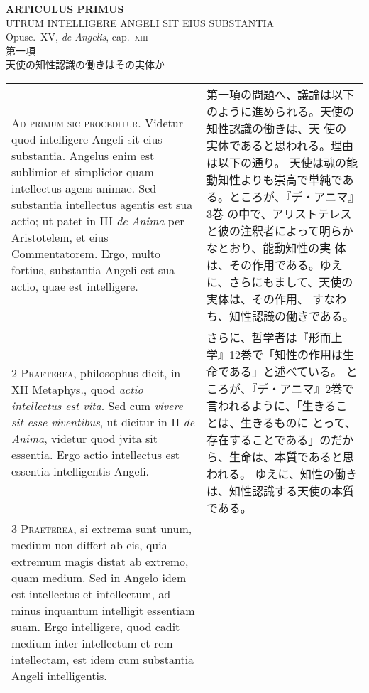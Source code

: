 \documentclass[10pt]{jsarticle} %
\begin{document}
\begin{center}
 {\Large {\bf ARTICULUS PRIMUS}}\\
 {\large UTRUM INTELLIGERE ANGELI SIT EIUS SUBSTANTIA}\\
 {\footnotesize Opusc.~XV, {\itshape de Angelis}, cap.~{\scshape xiii}}\\
 {\Large 第一項\\天使の知性認識の働きはその実体か}
\end{center}

\begin{longtable}{p{21em}p{21em}}

{\huge A}{\scshape d primum sic proceditur}. Videtur quod intelligere
Angeli sit eius substantia. Angelus enim est sublimior et simplicior
quam intellectus agens animae. Sed substantia intellectus agentis est
sua actio; ut patet in III {\itshape de Anima} per Aristotelem, et eius
Commentatorem. Ergo, multo fortius, substantia Angeli est sua actio,
quae est intelligere.


&

第一項の問題へ、議論は以下のように進められる。天使の知性認識の働きは、天
使の実体であると思われる。理由は以下の通り。
天使は魂の能動知性よりも崇高で単純である。ところが、『デ・アニマ』3巻
 の中で、アリストテレスと彼の注釈者によって明らかなとおり、能動知性の実
 体は、その作用である。ゆえに、さらにもまして、天使の実体は、その作用、
 すなわち、知性認識の働きである。
 

\\

{\scshape  2 Praeterea}, philosophus dicit, in XII Metaphys., quod {\itshape actio
 intellectus est vita}. Sed cum {\itshape vivere sit esse viventibus}, ut dicitur in
 II {\itshape de Anima}, videtur quod jvita sit essentia. Ergo actio intellectus est
 essentia intelligentis Angeli.

&

さらに、哲学者は『形而上学』12巻で「知性の作用は生命である」と述べている。
 ところが、『デ・アニマ』2巻で言われるように、「生きることは、生きるものに
 とって、存在することである」のだから、生命は、本質であると思われる。
ゆえに、知性の働きは、知性認識する天使の本質である。



\\


{\scshape  3 Praeterea}, si extrema sunt unum, medium non differt ab
 eis, quia extremum magis distat ab extremo, quam medium. Sed in Angelo
 idem est intellectus et intellectum, ad minus inquantum intelligit
 essentiam suam. Ergo intelligere, quod cadit medium inter intellectum
 et rem intellectam, est idem cum substantia Angeli intelligentis.



\end{longtable}
\end{document}
